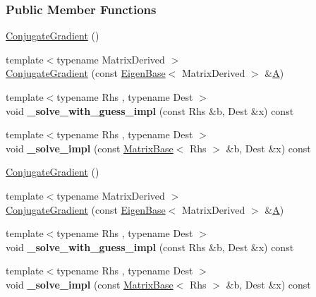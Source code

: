 \subsubsection*{Public Member Functions}
\begin{DoxyCompactItemize}
\item 
\hyperlink{group___iterative_linear_solvers___module_a92a9656ca9fa4da240194f89229255eb}{Conjugate\+Gradient} ()
\item 
{\footnotesize template$<$typename Matrix\+Derived $>$ }\\\hyperlink{group___iterative_linear_solvers___module_ac10f778fcd137eca1f6057c8ddd3d644}{Conjugate\+Gradient} (const \hyperlink{group___core___module_struct_eigen_1_1_eigen_base}{Eigen\+Base}$<$ Matrix\+Derived $>$ \&\hyperlink{group___core___module_class_eigen_1_1_matrix}{A})
\item 
\mbox{\label{group___iterative_linear_solvers___module_a06dadd6b4282026f340202d987ecd23f}} 
{\footnotesize template$<$typename Rhs , typename Dest $>$ }\\void {\bfseries \+\_\+solve\+\_\+with\+\_\+guess\+\_\+impl} (const Rhs \&b, Dest \&x) const
\item 
\mbox{\label{group___iterative_linear_solvers___module_a29cf39cbb200b90db87c83fea233478c}} 
{\footnotesize template$<$typename Rhs , typename Dest $>$ }\\void {\bfseries \+\_\+solve\+\_\+impl} (const \hyperlink{group___core___module_class_eigen_1_1_matrix_base}{Matrix\+Base}$<$ Rhs $>$ \&b, Dest \&x) const
\item 
\hyperlink{group___iterative_linear_solvers___module_a92a9656ca9fa4da240194f89229255eb}{Conjugate\+Gradient} ()
\item 
{\footnotesize template$<$typename Matrix\+Derived $>$ }\\\hyperlink{group___iterative_linear_solvers___module_ac10f778fcd137eca1f6057c8ddd3d644}{Conjugate\+Gradient} (const \hyperlink{group___core___module_struct_eigen_1_1_eigen_base}{Eigen\+Base}$<$ Matrix\+Derived $>$ \&\hyperlink{group___core___module_class_eigen_1_1_matrix}{A})
\item 
\mbox{\label{group___iterative_linear_solvers___module_a06dadd6b4282026f340202d987ecd23f}} 
{\footnotesize template$<$typename Rhs , typename Dest $>$ }\\void {\bfseries \+\_\+solve\+\_\+with\+\_\+guess\+\_\+impl} (const Rhs \&b, Dest \&x) const
\item 
\mbox{\label{group___iterative_linear_solvers___module_a29cf39cbb200b90db87c83fea233478c}} 
{\footnotesize template$<$typename Rhs , typename Dest $>$ }\\void {\bfseries \+\_\+solve\+\_\+impl} (const \hyperlink{group___core___module_class_eigen_1_1_matrix_base}{Matrix\+Base}$<$ Rhs $>$ \&b, Dest \&x) const
\end{DoxyCompactItemize}

